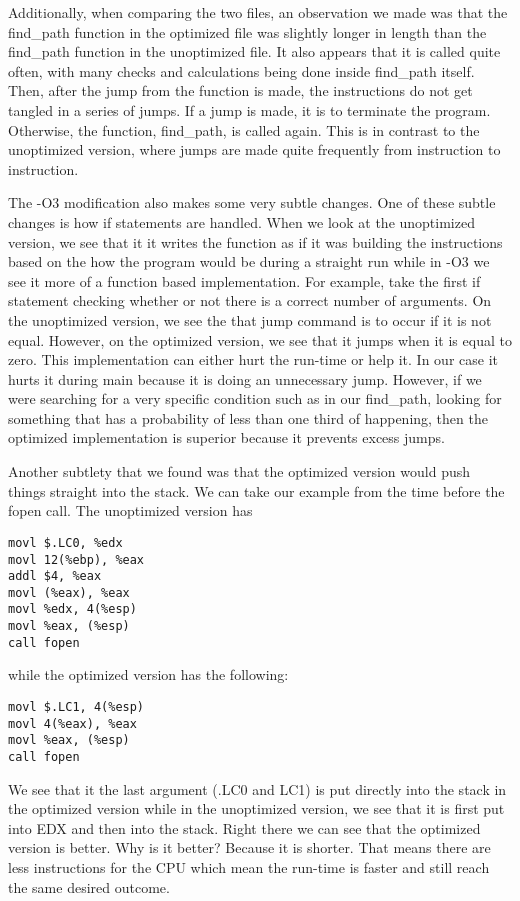 \documentclass[12pt,letterpaper]{article}
\begin{document}
Additionally, when comparing the two files, an observation we made was that the find\_path function in the optimized file was slightly longer in length than the find\_path function in the unoptimized file. It also appears that it is called quite often, with many checks and calculations being done inside find\_path itself. Then, after the jump from the function is made, the instructions do not get tangled in a series of jumps. If a jump is made, it is to terminate the program. Otherwise, the function, find\_path, is called again. This is in contrast to the unoptimized version, where jumps are made quite frequently from instruction to instruction.
        
The -O3 modification also makes some very subtle changes. One of these subtle changes is how if statements are handled. When we look at the unoptimized version, we see that it it writes the function as if it was building the instructions based on the how the program would be during a straight run while in -O3 we see it more of a function based implementation. For example, take the first if statement checking whether or not there is a correct number of arguments. On the unoptimized version, we see the that jump command is to occur if it is not equal. However, on the optimized version, we see that it jumps when it is equal to zero. This implementation can either hurt the run-time or help it. In our case it hurts it during main because it is doing an unnecessary jump. However, if we were searching for a very specific condition such as in our find\_path, looking for something that has a probability of less than one third of happening, then the optimized implementation is superior because it prevents excess jumps.

Another subtlety that we found was that the optimized version would push things straight into the stack. We can take our example from the time before the fopen call. The unoptimized version has
\begin{verbatim}
movl $.LC0, %edx
movl 12(%ebp), %eax
addl $4, %eax
movl (%eax), %eax
movl %edx, 4(%esp)
movl %eax, (%esp)
call fopen
\end{verbatim}
while the optimized version has the following:
\begin{verbatim}
movl $.LC1, 4(%esp)
movl 4(%eax), %eax
movl %eax, (%esp)
call fopen
\end{verbatim}
We see that it the last argument (.LC0 and LC1) is put directly into the stack in the optimized version while in the unoptimized version, we see that it is first put into EDX and then into the stack. Right there we can see that the optimized version is better. Why is it better? Because it is shorter. That means there are less instructions for the CPU which mean the run-time is faster and still reach the same desired outcome.
\end{document}
